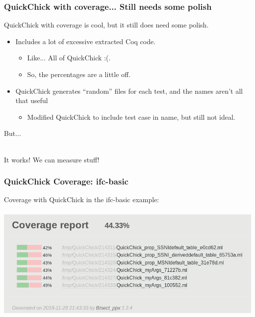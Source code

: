 \documentclass{beamer}
\begin{document}
\begin{frame}
  \frametitle{QuickChick with coverage... Still needs some polish}

  QuickChick with coverage is cool, but it still does need some
  polish.\\

  \begin{itemize}
    \pause
  \item Includes a lot of excessive extracted Coq code.
    \pause
    \begin{itemize}
    \item Like... All of QuickChick :(.
    \item So, the percentages are a little off.
    \end{itemize}
    \pause
  \item QuickChick generates ``random'' files for each test, and the
    names aren't all that useful
    \begin{itemize}
    \item Modified QuickChick to include test case in name, but still
      not ideal.
    \end{itemize}
  \end{itemize}

  \pause

  But...\\~\\

  \pause

  {\huge It works! We can measure stuff!}
\end{frame}

\begin{frame}
  \frametitle{QuickChick Coverage: ifc-basic}

  Coverage with QuickChick in the ifc-basic example: \\~\\

  \includegraphics[width=\textwidth]{ifccoverage.png} \\
  
\end{frame}
\end{document}
